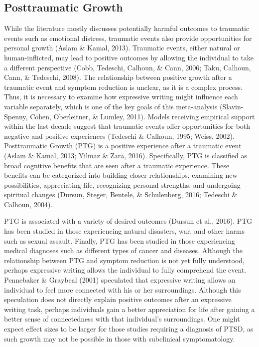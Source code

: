 \documentclass[man, mask]{apa6}
\theoremstyle{definition}
\theoremstyle{definition}
\theoremstyle{definition}
\theoremstyle{remark}
\begin{document}
\subsection{Posttraumatic Growth}\label{posttraumatic-growth}

While the literature mostly discusses potentially harmful outcomes to
traumatic events such as emotional distress, traumatic events also
provide opportunities for personal growth (Aslam \& Kamal, 2013).
Traumatic events, either natural or human-inflicted, may lead to
positive outcomes by allowing the individual to take a different
perspective (Cobb, Tedeschi, Calhoun, \& Cann, 2006; Taku, Calhoun,
Cann, \& Tedeschi, 2008). The relationship between positive growth after
a traumatic event and symptom reduction is unclear, as it is a complex
process. Thus, it is necessary to examine how expressive writing might
influence each variable separately, which is one of the key goals of
this meta-analysis (Slavin-Spenny, Cohen, Oberleitner, \& Lumley, 2011).
Models receiving empirical support within the last decade suggest that
traumatic events offer opportunities for both negative and positive
experiences (Tedeschi \& Calhoun, 1995; Weiss, 2002). Posttraumatic
Growth (PTG) is a positive experience after a traumatic event (Aslam \&
Kamal, 2013; Yilmaz \& Zara, 2016). Specifically, PTG is classified as
broad cognitive benefits that are seen after a traumatic experience.
These benefits can be categorized into building closer relationships,
examining new possibilities, appreciating life, recognizing personal
strengths, and undergoing spiritual changes (Dursun, Steger, Bentele, \&
Schulenberg, 2016; Tedeschi \& Calhoun, 2004).

PTG is associated with a variety of desired outcomes (Dursun et al.,
2016). PTG has been studied in those experiencing natural disasters,
war, and other harms such as sexual assault. Finally, PTG has been
studied in those experiencing medical diagnoses such as different types
of cancer and diseases. Although the relationship between PTG and
symptom reduction is not yet fully understood, perhaps expressive
writing allows the individual to fully comprehend the event. Pennebaker
\& Graybeal (2001) speculated that expressive writing allows an
individual to feel more connected with his or her surroundings. Although
this speculation does not directly explain positive outcomes after an
expressive writing task, perhaps individuals gain a better appreciation
for life after gaining a better sense of connectedness with that
individual's surroundings. One might expect effect sizes to be larger
for those studies requiring a diagnosis of PTSD, as such growth may not
be possible in those with subclinical symptomatology.
\end{document}
